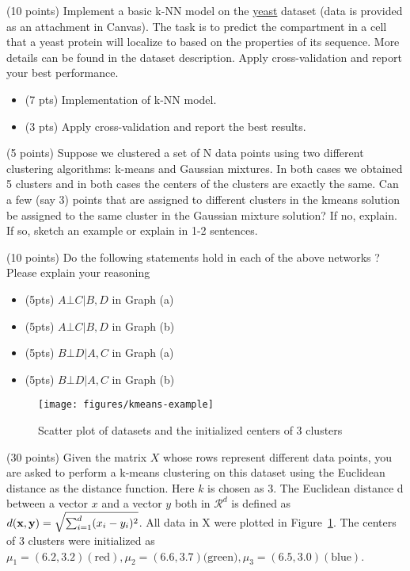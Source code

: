\documentclass{exam}
\newcommand{\xx}{{\bf{x}}}
\newcommand{\yy}{{\bf{y}}}
\begin{document}
\begin{questions}

\label{q1} (10 points)  Implement a basic k-NN model on the \href{http://archive.ics.uci.edu/ml/datasets/yeast}{yeast} dataset (data is provided as an attachment in Canvas). The task is to predict the compartment in a cell that a yeast protein will localize to based on the properties of its sequence. More details can be found in the dataset description. Apply cross-validation and report your best performance.
\begin{itemize}
    \item (7 pts) Implementation of k-NN model.
    \item (3 pts) Apply cross-validation and report the best results.
\end{itemize}


\newpage
{}\label{q1} (5 points)  Suppose we clustered a set of N data points using two different clustering algorithms: k-means and Gaussian mixtures. In both cases we obtained 5 clusters and in both cases the centers of the clusters are exactly the same. Can a few (say 3) points that are assigned to different clusters in the kmeans solution be assigned to the same cluster in the Gaussian mixture solution? If no, explain. If
so, sketch an example or explain in 1-2 sentences.

\newpage
\begin{figure}
\centering
{}
\end{figure}
\label{q2} (10 points)
Do the following statements hold in each of the above networks ? Please explain your reasoning
\begin{itemize}
\item (5pts) $A\bot C | B, D$ in Graph (a)
\item (5pts) $A\bot C | B, D$ in Graph (b)
\item (5pts) $B\bot D | A,C$ in Graph (a)
\item (5pts) $B\bot D | A,C$ in Graph (b)
\end{itemize}


\newpage
\begin{figure}
\centering
\texttt{[image: figures/kmeans-example]}
\caption{Scatter plot of datasets and the initialized centers of 3 clusters}\label{fig:kmeans}
\end{figure}
\label{q3} (30 points)  Given the matrix $X$ whose rows represent different data points, you are asked to perform a k-means clustering on this dataset using the Euclidean distance as the distance function. Here $k$ is chosen as $3$. The Euclidean distance d between a vector $x$ and a vector $y$ both in $\mathcal{R}^d$ is defined as $d(\xx, \yy) = \sqrt{\sum_{i=1}^d (x_i - y_i)^2}$. All data in X were plotted in Figure~\ref{fig:kmeans}. The centers of $3$ clusters were initialized as $\mu_1= (6.2, 3.2) (\text{red}), \mu_2 = (6.6, 3.7) (\text{green)}, \mu_3 = (6.5, 3.0) (\text{blue})$.


\end{questions}
\end{document}
